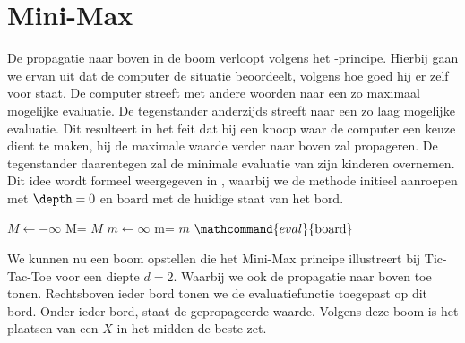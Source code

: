 \section{Mini-Max}
De propagatie naar boven in de boom verloopt volgens het -principe. Hierbij gaan we ervan uit dat de computer de situatie beoordeelt, volgens hoe goed hij er zelf voor staat. De computer streeft met andere woorden naar een zo maximaal mogelijke evaluatie. De tegenstander anderzijds streeft naar een zo laag mogelijke evaluatie. Dit resulteert in het feit dat bij een knoop waar de computer een keuze dient te maken, hij de maximale waarde verder naar boven zal propageren. De tegenstander daarentegen zal de minimale evaluatie van zijn kinderen overnemen. Dit idee wordt formeel weergegeven in , waarbij we de methode initieel aanroepen met $\depth=0$ en $\mbox{board}$ met de huidige staat van het bord.
\begin{algorithm}[htb]                      %
\caption{$\mathcommand{minimax}{\mbox{board},\depth}$}          %
\label{alg:minimax}                           %
\begin{algorithmic}[1]                    %
\IF{$\depth<\depthbound$}
\STATE{}
\STATE$M\leftarrow-\infty$
\STATE M=
\ENDFOR
\RETURN $M$
\ELSE
\STATE$m\leftarrow\infty$
\STATE m=
\ENDFOR
\RETURN $m$
\ENDIF
\ELSE
\STATE{}
\RETURN $\mathcommand{eval}{\mbox{board}}$
\ENDIF
\end{algorithmic}
\end{algorithm}
\begin{leftbar}
We kunnen nu een boom opstellen die het Mini-Max principe illustreert bij Tic-Tac-Toe voor een diepte $d=2$. Waarbij we ook de propagatie naar boven toe tonen. Rechtsboven ieder bord tonen we de evaluatiefunctie toegepast op dit bord. Onder ieder bord, staat de gepropageerde waarde. Volgens deze boom is het plaatsen van een $X$ in het midden de beste zet.
\end{leftbar}
